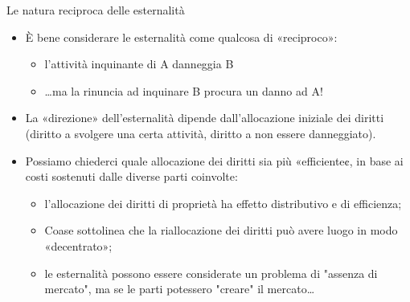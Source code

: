 \documentclass[aspectratio=64,11pt]{beamer}
\begin{document}
\begin{frame}{Le natura reciproca delle esternalità}
\begin{itemize}
\item È bene considerare le esternalità come qualcosa di «reciproco»:
\begin{itemize}
\item l'attività inquinante di A danneggia B
\item \ldots{}ma la rinuncia ad inquinare B procura un danno ad A!
\end{itemize}
\item La «direzione» dell'esternalità dipende dall'allocazione iniziale dei
diritti (diritto a svolgere una certa attività, diritto a non essere
danneggiato).
\item Possiamo chiederci quale allocazione dei diritti sia più «efficiente¢, in
base ai costi sostenuti dalle diverse parti coinvolte:
\begin{itemize}
\item l'allocazione dei diritti di proprietà ha effetto distributivo e di
efficienza;
\item Coase sottolinea che la riallocazione dei diritti può avere luogo in modo
«decentrato»;
\item le esternalità possono essere considerate un problema di "assenza di
mercato", ma se le parti potessero "creare" il mercato\ldots{}
\end{itemize}
\end{itemize}
\end{frame}
\end{document}
